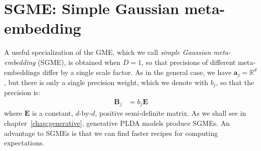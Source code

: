 \documentclass[a4paper,oneside,12pt,english]{report}
\def\R{\mathbb{R}}
\def\Bmat{\mathbf{B}}
\def\Emat{\mathbf{E}}
\def\avec{\mathbf{a}}
\begin{document}
%
%


\section{SGME: Simple Gaussian meta-embedding}
\label{sec:SGME}
A useful specialization of the GME, which we call \emph{simple Gaussian meta-embedding} (SGME), is obtained when $D=1$, so that precisions of different meta-embeddings differ by a single scale factor. As in the general case, we have $\avec_j=\R^d$, but there is only a single precision weight, which we denote with $b_j$, so that the precision is: 
\begin{align}
\Bmat_j &= b_j\Emat
\end{align}
where $\Emat$ is a constant, $d$-by-$d$, positive semi-definite matrix. As we shall see in chapter~\ref{chap:generative}, generative PLDA models produce SGMEs. An advantage to SGMEs is that we can find faster recipes for computing expectations. 
\end{document}
